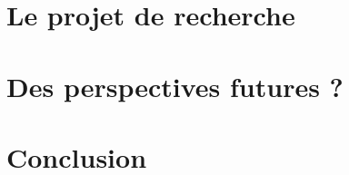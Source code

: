 \documentclass[12pt]{article}
\begin{document}
    \section{Le projet de recherche}\label{sec:le-projet-de-recherche}


    \section{Des perspectives futures ?}\label{sec:des-perspectives-futures-?}


    \section{Conclusion}\label{sec:conclusion}
\end{document}
